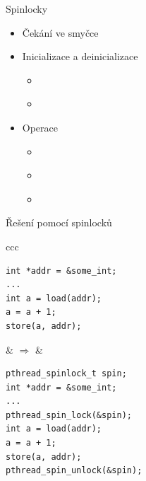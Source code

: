 \begin{frame}[fragile]{Spinlocky}

  \begin{itemize}
    \item Čekání ve smyčce

    \pause

    \item Inicializace a deinicializace 
    \begin{itemize}
      \item { \footnotesize {}}
      \item { \footnotesize {}}
    \end{itemize}

    \pause

    \item Operace
    \begin{itemize}
      \item { \footnotesize {}}
      \item { \footnotesize {}}
      \item { \footnotesize {}}
    \end{itemize}
  \end{itemize}

  \pause

  \begin{block}{Řešení pomocí spinlocků}
  \begin{center}
  \begin{tabular}{ccc}
  \begin{lstlisting}
int *addr = &some_int;
...
int a = load(addr);
a = a + 1;
store(a, addr);
  \end{lstlisting} & $\Rightarrow$ &
  \begin{lstlisting}
pthread_spinlock_t spin;
int *addr = &some_int;
...
pthread_spin_lock(&spin);
int a = load(addr);
a = a + 1;
store(a, addr);
pthread_spin_unlock(&spin);
  \end{lstlisting}
  \end{tabular}
  \end{center}
  \end{block}

\end{frame}

